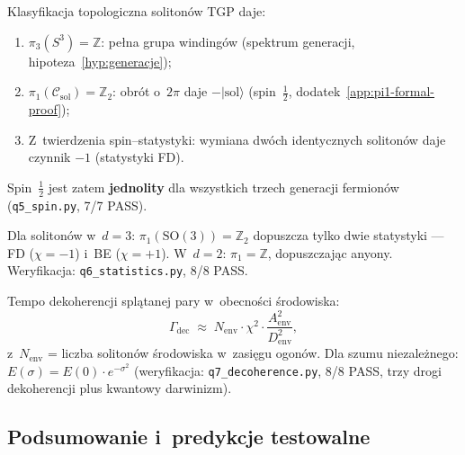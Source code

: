 \begin{theorem}%
\label{thm:P-spin-half-short}
Klasyfikacja topologiczna solitonów TGP daje:
\begin{enumerate}[nosep,label=(\alph*)]
  \item $\pi_3(S^3) = \mathbb{Z}$: pełna grupa windingów
        (spektrum generacji, hipoteza~\ref{hyp:generacje});
  \item $\pi_1(\mathcal{C}_{\mathrm{sol}}) = \mathbb{Z}_2$:
        obrót o~$2\pi$ daje $-|\mathrm{sol}\rangle$
        (spin~$\tfrac{1}{2}$, dodatek~\ref{app:pi1-formal-proof});
  \item Z~twierdzenia spin--statystyki: wymiana dwóch identycznych
        solitonów daje czynnik $-1$ (statystyki FD).
\end{enumerate}
Spin~$\tfrac{1}{2}$ jest zatem \textbf{jednolity} dla wszystkich
trzech generacji fermionów (\texttt{q5\_spin.py}, 7/7 PASS).
\end{theorem}

\begin{proposition}%
\label{prop:P-statistics}
Dla solitonów w~$d = 3$: $\pi_1(\mathrm{SO}(3)) = \mathbb{Z}_2$
dopuszcza tylko dwie statystyki --- FD ($\chi = -1$) i~BE ($\chi = +1$).
W~$d = 2$: $\pi_1 = \mathbb{Z}$, dopuszczając anyony.
Weryfikacja: \texttt{q6\_statistics.py}, 8/8 PASS.
\end{proposition}

\begin{theorem}%
\label{thm:P-decoherence}
Tempo dekoherencji splątanej pary w~obecności środowiska:
\begin{equation}\label{eq:P-decoherence}
  \Gamma_{\mathrm{dec}}
  \;\approx\; N_{\mathrm{env}} \cdot \chi^2 \cdot
  \frac{A_{\mathrm{env}}^2}{D_{\mathrm{env}}^2},
\end{equation}
z~$N_{\mathrm{env}}$ = liczba solitonów środowiska
w~zasięgu ogonów. Dla szumu niezależnego:
$E(\sigma) = E(0)\cdot e^{-\sigma^2}$ (weryfikacja:
\texttt{q7\_decoherence.py}, 8/8 PASS, trzy drogi dekoherencji
plus kwantowy darwinizm).
\end{theorem}

\subsection{Podsumowanie i~predykcje testowalne}%
\label{app:P-summary}

